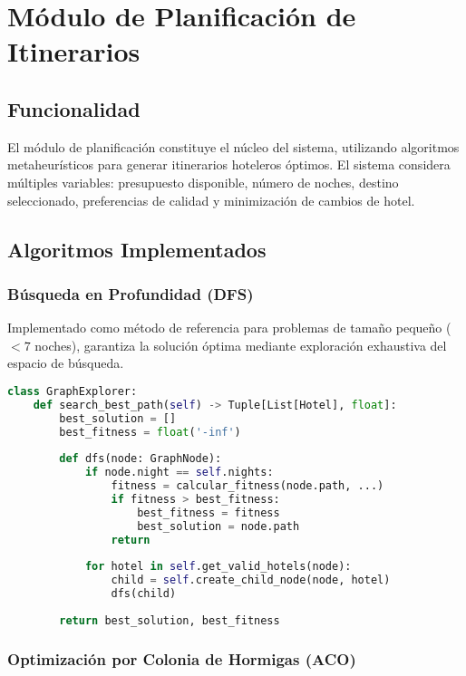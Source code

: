 \documentclass[runningheads]{llncs}
\begin{document}
\section{Módulo de Planificación de Itinerarios}

\subsection{Funcionalidad}

El módulo de planificación constituye el núcleo del sistema, utilizando algoritmos metaheurísticos para generar itinerarios hoteleros óptimos. El sistema considera múltiples variables: presupuesto disponible, número de noches, destino seleccionado, preferencias de calidad y minimización de cambios de hotel.

\subsection{Algoritmos Implementados}

\subsubsection{Búsqueda en Profundidad (DFS)}

Implementado como método de referencia para problemas de tamaño pequeño ($< 7$ noches), garantiza la solución óptima mediante exploración exhaustiva del espacio de búsqueda.

\begin{lstlisting}[language=Python, caption=Estructura del algoritmo DFS]
class GraphExplorer:
    def search_best_path(self) -> Tuple[List[Hotel], float]:
        best_solution = []
        best_fitness = float('-inf')
        
        def dfs(node: GraphNode):
            if node.night == self.nights:
                fitness = calcular_fitness(node.path, ...)
                if fitness > best_fitness:
                    best_fitness = fitness
                    best_solution = node.path
                return
            
            for hotel in self.get_valid_hotels(node):
                child = self.create_child_node(node, hotel)
                dfs(child)
        
        return best_solution, best_fitness
\end{lstlisting}

\subsubsection{Optimización por Colonia de Hormigas (ACO)}
\end{document}
